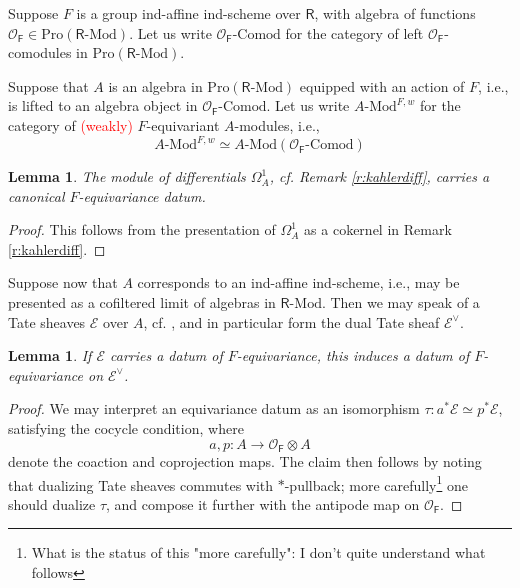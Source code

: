 \documentclass{amsart}
\newtheorem{Lem}[Thm]{Lemma}
\theoremstyle{definition}
\newcommand{\comod}{\text{-Comod}}
\newcommand{\OOF}{\OO_{\mathsf{F}}}
\newcommand{\Pro}{\on{Pro}}
\newcommand{\OO}{\mathscr{O}}
\renewcommand{\mod}{\text{-}\on{Mod}}
\newcommand{\on}{\mathrm}
\newcommand{\Ring}{\mathsf{R}}
\numberwithin{equation}{section}
\begin{document}
\iffalse 


























Suppose $F$ is a group ind-affine ind-scheme over $\Ring$, with algebra of functions $\OOF \in \Pro(\Ring\mod)$. Let us write $\OOF\comod$ for the category of left $\OOF$-comodules in $\Pro(\Ring\mod)$. 

Suppose that $A$ is an algebra in $\Pro(\Ring\mod)$ equipped with an action of $F$, i.e., is lifted to an algebra object in $\OOF\comod$. Let us write $A\mod^{F,w}$ for the category of \textcolor{red}{(weakly)} $F$-equivariant $A$-modules, i.e., $$A\mod^{F,w} \simeq A\mod(\OOF\comod)$$


\begin{Lem} The module of differentials $\Omega^1_A$, cf. Remark \ref{r:kahlerdiff}, carries a canonical $F$-equivariance datum.
\end{Lem}


\begin{proof} This follows from the presentation of $\Omega^1_A$ as a cokernel in Remark \ref{r:kahlerdiff}. 
\end{proof}



Suppose now that $A$ corresponds to an ind-affine ind-scheme, i.e., may be presented as a cofiltered limit of algebras in $\Ring\mod$. Then we may speak of a Tate sheaves $\mathscr{E}$ over $A$, cf.  \cite[Section 6.3.2]{DrInf}, and in particular form the dual Tate sheaf $\mathscr{E}^\vee$. 


\begin{Lem} If $\mathscr{E}$ carries a datum of $F$-equivariance, this induces a datum of $F$-equivariance on $\mathscr{E}^\vee$. 
\end{Lem}

\begin{proof}We may interpret an equivariance  datum as an isomorphism $\tau: a^* \mathscr{E} \simeq p^* \mathscr{E}$, satisfying the cocycle condition, where $$a,p: A \rightarrow \OOF \otimes A$$
    denote the coaction and coprojection maps. The claim then follows by noting that dualizing Tate sheaves commutes with $*$-pullback; more carefully\footnote{What is the status of this "more carefully": I don't quite understand what follows} one should dualize $\tau$, and compose it further with the antipode map on $\OOF$.   
\end{proof}
\end{document}
